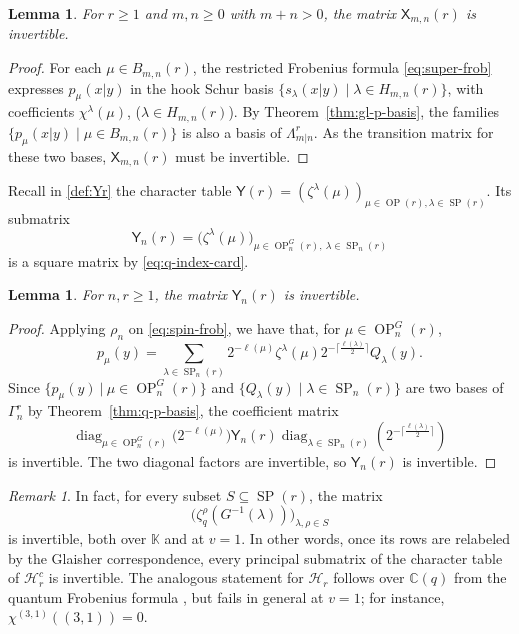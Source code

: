 \documentclass[11pt]{amsart}
\numberwithin{equation}{section}
\theoremstyle{plain}
\newtheorem{lem}[thm]{Lemma}
\theoremstyle{definition}
\theoremstyle{remark}
\newtheorem{rmk}[thm]{Remark}
\begin{document}
\begin{lem}
\label{thm:gl-mat-ns}
For $r\geq 1$ and $m,n\geq0$ with $m+n>0$, the matrix $\mathsf X_{m,n}(r)$ is invertible.
\end{lem}

\begin{proof}
For each $\mu\in B_{m,n}(r)$, the restricted Frobenius formula
\eqref{eq:super-frob} expresses $p_\mu(x|y)$ in
the hook Schur basis $\{s_\lambda(x|y)\mid\lambda\in H_{m,n}(r)\}$, with coefficients
$\chi^\lambda(\mu)$, ($\lambda\in H_{m,n}(r)$).
By Theorem~\ref{thm:gl-p-basis}, the families
$\{p_\mu(x|y)\mid\mu\in B_{m,n}(r)\}$ is also a basis of
$\Lambda_{m|n}^{r}$. As the transition matrix for these two bases, $\mathsf X_{m,n}(r)$ must be invertible.
\end{proof}

%
Recall in \eqref{def:Yr} the character table $\mathsf Y(r)=(\zeta^\lambda(\mu))_{ \mu\in\operatorname{OP}(r), \lambda\in\operatorname{SP}(r)}$.
Its submatrix
\begin{equation}\label{eq:q-matrix-class}
\mathsf Y_n(r)
=
\bigl(\zeta^\lambda(\mu)\bigr)_{
\mu\in\operatorname{OP}_n^G(r),\ \lambda\in\operatorname{SP}_n(r)}
\end{equation}
is a square matrix by \eqref{eq:q-index-card}.

\begin{lem}\label{thm:q-mat-class}
For $n, r\geq 1$, the matrix $\mathsf Y_{n}(r)$ is invertible.
\end{lem}

\begin{proof}
Applying $\rho_n$ on \eqref{eq:spin-frob}, we have that, for
$\mu\in\operatorname{OP}_n^G(r)$,
$$
p_\mu(y)
=
\sum_{\lambda\in\operatorname{SP}_n(r)}
2^{-\ell(\mu)}\zeta^\lambda(\mu)
2^{-\lceil\frac{\ell(\lambda)}{2}\rceil}
Q_\lambda(y).
$$
Since $\{p_\mu(y)~|~\mu\in\operatorname{OP}_n^G(r)\}$ and $\{Q_\lambda(y)\mid\lambda\in\operatorname{SP}_n(r)\}$ are two bases of $\Gamma_n^r$ by Theorem~\ref{thm:q-p-basis}, the coefficient matrix
$$
\operatorname{diag}_{\mu\in\operatorname{OP}_n^G(r)}
  \bigl(2^{-\ell(\mu)}\bigr)
\mathsf Y_n(r)
\operatorname{diag}_{\lambda\in\operatorname{SP}_n(r)}
  \left(2^{-\lceil\frac{\ell(\lambda)}{2}\rceil}\right)
$$
is invertible. The two diagonal factors are invertible, so
$\mathsf Y_{n}(r)$ is invertible.
\end{proof}

\begin{rmk}
In fact, for every subset $S\subseteq\operatorname{SP}(r)$, the matrix
$$
\bigl(\zeta_q^\rho(G^{-1}(\lambda))\bigr)_{\lambda,\rho\in S}
$$
is invertible, both over $\mathbb{K}$ and at $v=1$.
In other words, once its rows are relabeled by the Glaisher
correspondence, every principal submatrix of the character table
of $\mathcal H_r^c$ is invertible.
The analogous statement for $\mathcal H_r$ follows over $\mathbb C(q)$
from the quantum Frobenius formula
\cite[Proposition~5.2]{WW15}, but fails in general at $v=1$;
for instance, $\chi^{(3,1)}((3,1))=0$.
\end{rmk}
\end{document}
